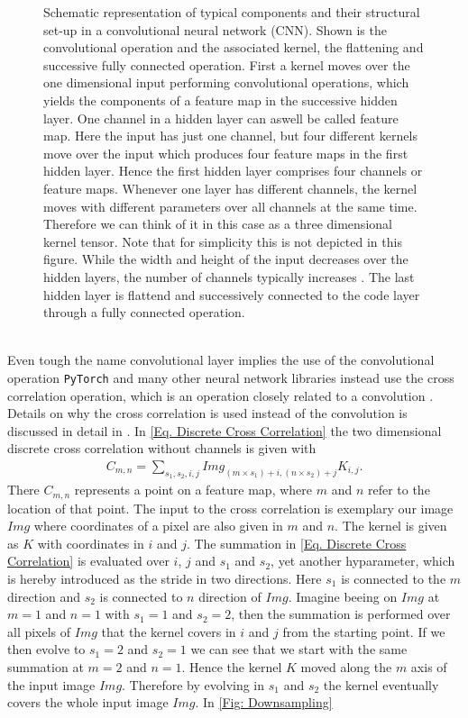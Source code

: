 \begin{figure}
	\centering
	
	\caption{\footnotesize Schematic representation of typical components and their structural set-up in a convolutional neural network (CNN). Shown is the convolutional operation and the associated kernel, the flattening and successive fully connected operation. First a kernel moves over the one dimensional input performing convolutional operations, which yields the components of a feature map in the successive hidden layer. One channel in a hidden layer can aswell be called feature map. Here the input has just one channel, but four different kernels move over the input which produces four feature maps in the first hidden layer. Hence the first hidden layer comprises four channels or feature maps. Whenever one layer has different channels, the kernel moves with different parameters over all channels at the same time. Therefore we can think of it in this case as a three dimensional kernel tensor. Note that for simplicity this is not depicted in this figure. While the width and height of the input decreases over the hidden layers, the number of channels typically increases . The last hidden layer is flattend and successively connected to the code layer through a fully connected operation.}
	\label{Fig: Kernel}
\end{figure}
\\Even tough the name convolutional layer implies the use of the convolutional operation \texttt{PyTorch} and many other neural network libraries instead use the cross correlation operation, which is an operation closely related to a convolution \cite{Goodfellow} \cite{Pytorch website}. Details on why the cross correlation is used instead of the convolution is discussed in detail in \cite{Goodfellow}. In \cref{Eq. Discrete Cross Correlation} the two dimensional discrete cross correlation without channels is given with
\begin{align}
C_{m,n} = \sum_{s_1,s_2,i,j}Img_{(m\times s_1)+i,(n\times s_2)+j}K_{i,j}\mathrm{.}
\label{Eq. Discrete Cross Correlation}
\end{align}
There $C_{m,n}$ represents a point on a feature map, where $m$ and $n$ refer to the location of that point. The input to the cross correlation is exemplary our image $Img$ where coordinates of a pixel are also given in $m$ and $n$. The kernel is given as $K$ with coordinates in $i$ and $j$. The summation in \cref{Eq. Discrete Cross Correlation} is evaluated over $i$, $j$ and $s_1$ and $s_2$, yet another hyparameter, which is hereby introduced as the stride in two directions. Here $s_1$ is connected to the $m$ direction and $s_2$ is connected to $n$ direction of $Img$. Imagine beeing on $Img$ at $m=1$ and $n=1$ with $s_1=1$ and $s_2=2$, then the summation is performed over all pixels of $Img$ that the kernel covers in $i$ and $j$ from the starting point. If we then evolve to $s_1=2$ and $s_2=1$ we can see that we start with the same summation at $m=2$ and $n=1$. Hence the kernel $K$ moved along the $m$ axis of the input image $Img$. Therefore by evolving in $s_1$ and $s_2$ the kernel eventually covers the whole input image $Img$. In \cref{Fig: Downsampling} \\

